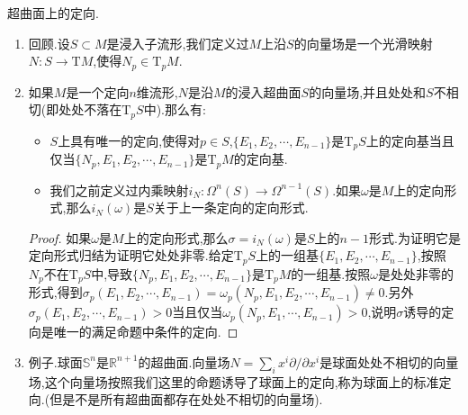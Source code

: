 超曲面上的定向.
\begin{enumerate}
	\item 回顾.设$S\subset M$是浸入子流形,我们定义过$M$上沿$S$的向量场是一个光滑映射$N:S\to\mathrm{T}M$,使得$N_p\in\mathrm{T}_pM$.
	\item 如果$M$是一个定向$n$维流形,$N$是沿$M$的浸入超曲面$S$的向量场,并且处处和$S$不相切(即处处不落在$\mathrm{T}_pS$中).那么有:
	\begin{itemize}
		\item $S$上具有唯一的定向,使得对$p\in S$,$\{E_1,E_2,\cdots,E_{n-1}\}$是$\mathrm{T}_pS$上的定向基当且仅当$\{N_p,E_1,E_2,\cdots,E_{n-1}\}$是$\mathrm{T}_pM$的定向基.
		\item 我们之前定义过内乘映射$i_N:\Omega^n(S)\to\Omega^{n-1}(S)$.如果$\omega$是$M$上的定向形式,那么$i_N(\omega)$是$S$关于上一条定向的定向形式.
	\end{itemize}
	\begin{proof}
		
		如果$\omega$是$M$上的定向形式,那么$\sigma=i_N(\omega)$是$S$上的$n-1$形式.为证明它是定向形式归结为证明它处处非零.给定$\mathrm{T}_pS$上的一组基$\{E_1,E_2,\cdots,E_{n-1}\}$,按照$N_p$不在$\mathrm{T}_pS$中,导致$\{N_p,E_1,E_2,\cdots,E_{n-1}\}$是$\mathrm{T}_pM$的一组基.按照$\omega$是处处非零的形式,得到$\sigma_p(E_1,E_2,\cdots,E_{n-1})=\omega_p(N_p,E_1,E_2,\cdots,E_{n-1})\not=0$.另外$\sigma_p(E_1,E_2,\cdots,E_{n-1})>0$当且仅当$\omega_p(N_p,E_1,\cdots,E_{n-1})>0$,说明$\sigma$诱导的定向是唯一的满足命题中条件的定向.
	\end{proof}
    \item 例子.球面$\mathbb{S}^n$是$\mathbb{R}^{n+1}$的超曲面.向量场$N=\sum_ix^i\partial/\partial x^i$是球面处处不相切的向量场,这个向量场按照我们这里的命题诱导了球面上的定向,称为球面上的标准定向.(但是不是所有超曲面都存在处处不相切的向量场).
\end{enumerate}

